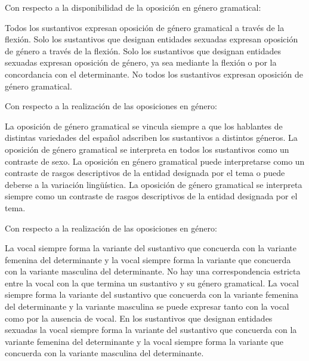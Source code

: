 \begin{ejercicio}
\begin{consignas}
  \item Con respecto a la disponibilidad de la oposición en género gramatical:
        \begin{exe}
          \ex Todos los sustantivos expresan oposición de género gramatical a
              través de la flexión.
          \ex Solo los sustantivos que designan entidades sexuadas expresan
              oposición de género a través de la flexión.
          \ex Solo los sustantivos que designan entidades sexuadas expresan
              oposición de género, ya sea mediante la flexión o por la
              concordancia con el determinante.
          \ex No todos los sustantivos expresan oposición de género gramatical.
        \end{exe}
  \item Con respecto a la realización de las oposiciones en género:
        \begin{exe}
          \ex La oposición de género gramatical se vincula siempre a que los
              hablantes de distintas variedades del español adscriben los
              sustantivos a distintos géneros.
          \ex La oposición de género gramatical se interpreta en todos los
              sustantivos como un contraste de sexo.
          \ex La oposición en género gramatical puede interpretarse como un
              contraste de rasgos descriptivos de la entidad designada por el
              tema o puede deberse a la variación lingüística.
          \ex La oposición de género gramatical se interpreta siempre como un
              contraste de rasgos descriptivos de la entidad designada por el
              tema.
        \end{exe}
  \item Con respecto a la realización de las oposiciones en género:
        \begin{exe}
          \ex La vocal  siempre forma la variante del sustantivo que
              concuerda con la variante femenina del determinante y la vocal
               siempre forma la variante que concuerda con la variante
              masculina del determinante.
          \ex No hay una correspondencia estricta entre la vocal con la que
              termina un sustantivo y su género gramatical.
          \ex La vocal  siempre forma la variante del sustantivo que
              concuerda con la variante femenina del determinante y la variante
              masculina se puede expresar tanto con la vocal  como por
              la ausencia de vocal.
          \ex En los sustantivos que designan entidades sexuadas la vocal
               siempre forma la variante del sustantivo que concuerda
              con la variante femenina del determinante y la vocal 
              siempre forma la variante que concuerda con la variante masculina
              del determinante.
        \end{exe}
\end{consignas}
\end{ejercicio}

